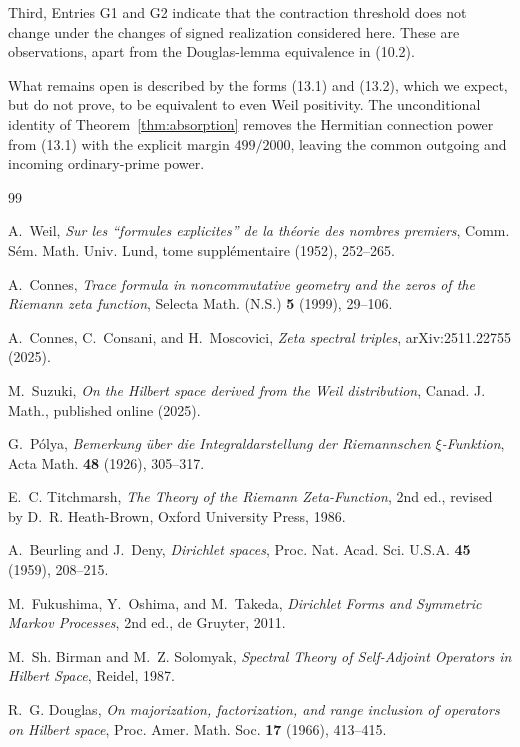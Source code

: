 \documentclass[11pt]{amsart}
\theoremstyle{definition}
\theoremstyle{remark}
\begin{document}
Third, Entries G1 and G2 indicate that the contraction threshold does not
change under the changes of signed realization considered here.  These
are observations, apart from the Douglas-lemma equivalence in (10.2).

What remains open is described by the forms (13.1) and (13.2), which we
expect, but do not prove, to be equivalent to even Weil positivity.  The
unconditional identity of Theorem~\ref{thm:absorption} removes the
Hermitian connection power from (13.1) with the explicit margin
\(499/2000\), leaving the common outgoing and incoming ordinary-prime
power.

\begin{thebibliography}{99}

A.~Weil,
\emph{Sur les ``formules explicites'' de la th\'eorie des nombres premiers},
Comm. S\'em. Math. Univ. Lund, tome suppl\'ementaire (1952), 252--265.

A.~Connes,
\emph{Trace formula in noncommutative geometry and the zeros of the
Riemann zeta function},
Selecta Math. (N.S.) \textbf{5} (1999), 29--106.

A.~Connes, C.~Consani, and H.~Moscovici,
\emph{Zeta spectral triples},
arXiv:2511.22755 (2025).

M.~Suzuki,
\emph{On the Hilbert space derived from the Weil distribution},
Canad. J. Math., published online (2025).

G.~P\'olya,
\emph{Bemerkung \"uber die Integraldarstellung der Riemannschen
\(\xi\)-Funktion},
Acta Math. \textbf{48} (1926), 305--317.

E.~C. Titchmarsh,
\emph{The Theory of the Riemann Zeta-Function},
2nd ed., revised by D.~R. Heath-Brown, Oxford University Press, 1986.

A.~Beurling and J.~Deny,
\emph{Dirichlet spaces},
Proc. Nat. Acad. Sci. U.S.A. \textbf{45} (1959), 208--215.

M.~Fukushima, Y.~Oshima, and M.~Takeda,
\emph{Dirichlet Forms and Symmetric Markov Processes},
2nd ed., de Gruyter, 2011.

M.~Sh. Birman and M.~Z. Solomyak,
\emph{Spectral Theory of Self-Adjoint Operators in Hilbert Space},
Reidel, 1987.

R.~G. Douglas,
\emph{On majorization, factorization, and range inclusion of operators on
Hilbert space},
Proc. Amer. Math. Soc. \textbf{17} (1966), 413--415.


\end{thebibliography}
\end{document}
